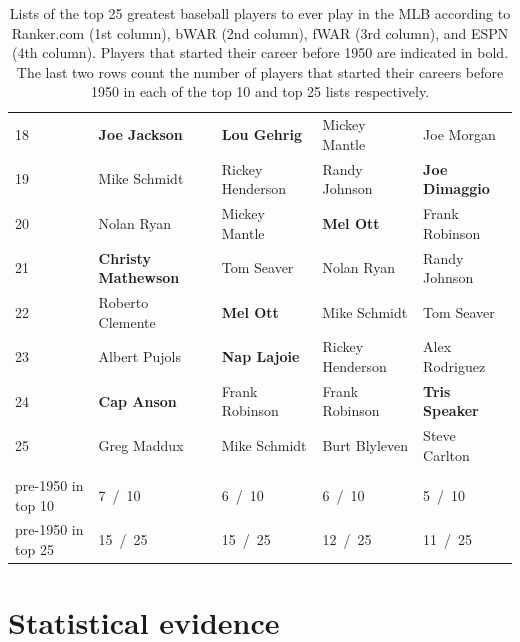 \documentclass[11pt]{article}\usepackage[]{graphicx}\usepackage[]{color}
\begin{document}
\begin{table}[h!]
\begin{center}
\begin{tabular}{lllll}
18 & {\bf Joe Jackson}       & {\bf Lou Gehrig}     & Mickey Mantle        & Joe Morgan           \\
19 & Mike Schmidt            & Rickey Henderson     & Randy Johnson        & {\bf Joe Dimaggio}   \\
20 & Nolan Ryan              & Mickey Mantle        & {\bf Mel Ott}        & Frank Robinson       \\
21 & {\bf Christy Mathewson} & Tom Seaver           & Nolan Ryan           & Randy Johnson        \\
22 & Roberto Clemente        & {\bf Mel Ott}        & Mike Schmidt         & Tom Seaver           \\
23 & Albert Pujols           & {\bf Nap Lajoie}     & Rickey Henderson     & Alex Rodriguez       \\
24 & {\bf Cap Anson}         & Frank Robinson       & Frank Robinson       & {\bf Tris Speaker}   \\
25 & Greg Maddux             & Mike Schmidt         & Burt Blyleven        & Steve Carlton        \\
 & & & & \\
pre-1950 in top 10 &   7 \,/\, 10  &   6 \,/\, 10  &   6 \,/\, 10  &   5 \,/\, 10  \\
pre-1950 in top 25 &  15 \,/\, 25  &  15 \,/\, 25  &  12 \,/\, 25  &  11 \,/\, 25  \\
\hline
\end{tabular}
\end{center}
\caption{Lists of the top 25 greatest baseball players to ever play in the 
  MLB according to Ranker.com (1st column), bWAR (2nd column), 
  fWAR (3rd column), and ESPN (4th column). Players that started their career 
  before 1950 are indicated in bold. The last two rows count the number of players 
  that started their careers before 1950 in each of the top 10 and top 25 lists 
  respectively.}
\label{top25}
\end{table}





\section{Statistical evidence}
\label{sec:Stats}
\end{document}
